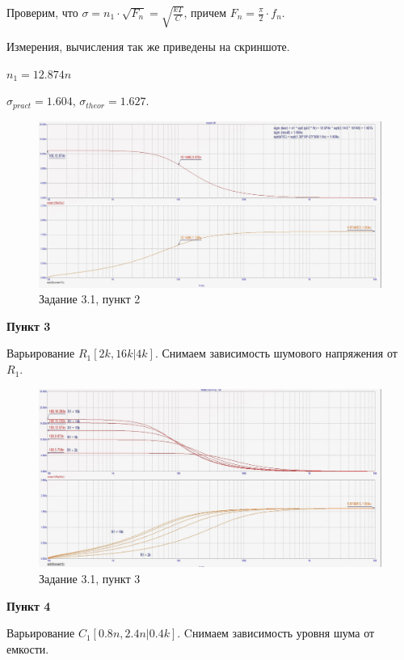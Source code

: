 \documentclass[a4paper, 14pt]{extarticle}%
\begin{document}
Проверим, что $\sigma = n_1\cdot \sqrt{F_n} = \sqrt{\frac{kT}{C}}$, причем $F_n = \frac{\pi}{2} \cdot f_n$.

Измерения, вычисления так же приведены на скриншоте.

$n_1 = 12.874n$

$\sigma_{pract} = 1.604$, $\sigma_{theor} = 1.627$.


\begin{figure}[h!]
			\centering
			\includegraphics[width=1.1\linewidth]{3/3_1_2.jpg}
			\caption{Задание 3.1, пункт 2}
			\label{A}
\end{figure}


\textbf{Пункт 3}


Варьирование $R_1[2k, 16k | 4k]$.
Снимаем зависимость шумового напряжения от $R_1$.

\begin{figure}[h!]
			\centering
			\includegraphics[width=1.1\linewidth]{3/3_1_4.jpg}
			\caption{Задание 3.1, пункт 3}
			\label{A}
\end{figure}


\textbf{Пункт 4}


Варьирование $C_1[0.8n, 2.4n | 0.4k]$.
Cнимаем зависимость уровня шума от емкости.
\end{document}
